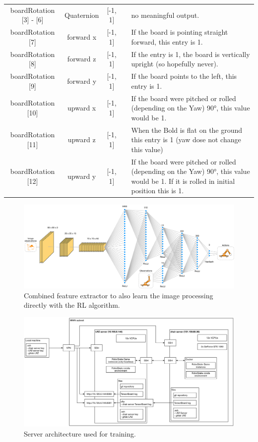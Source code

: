 \documentclass[conference]{IEEEtran}
\begin{document}
\begin{table}[ht!]
\begin{tabular}{c|c|c|c|p{6cm}}
        boardRotation [3] - [6] &  Quaternion &  [-1, 1]  &  & no meaningful output.  \\
        boardRotation [7] &  forward x  &  [-1, 1]  &    &   If the board is pointing straight forward, this entry is 1.  \\
        boardRotation [8] &  forward z &  [-1, 1]  &    &  If the entry is 1, the board is vertically upright (so hopefully never). \\
        boardRotation [9] &  forward y &  [-1, 1]  &    &  If the board points to the left, this entry is 1.  \\
        boardRotation [10] &  upward x  &  [-1, 1]  &    &  If the board were pitched or rolled (depending on the Yaw) 90°, this value would be 1.   \\
        boardRotation [11] &  upward z  &  [-1, 1]  &    &  When the Bold is flat on the ground this entry is 1 (yaw dose not change this value)  \\
        boardRotation [12] &  upward y  &  [-1, 1]  &    &  If the board were pitched or rolled (depending on the Yaw) 90°, this value would be 1. If it is rolled in initial position this is 1.   \\
    \end{tabular}
\end{table}

\begin{figure}[ht!]
  \centering
  \includegraphics[width=1.0\linewidth]{images/Learning_from_images_Policy.eps}
  \caption{Combined feature extractor to also learn the image processing directly with the RL algorithm.}
\label{fig:Combined_Policy}
\end{figure}

\begin{figure}[ht!]
  \centering
  \includegraphics[width=.9\linewidth]{images/Server_struktur.eps}
  \caption{Server architecture used for training.}
\label{fig:Server_struktur}
\end{figure}
\end{document}
